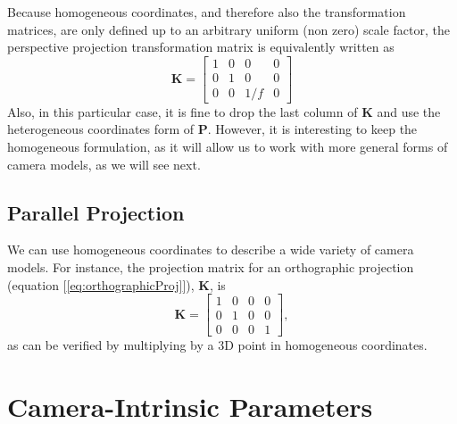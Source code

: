 Because homogeneous coordinates, and therefore also the transformation matrices, are only defined up to an arbitrary uniform (non zero) scale factor, the perspective projection transformation matrix is equivalently written as
\begin{equation}
    \mathbf{K} =             
    \begin{bmatrix}
    1 & 0 & 0 & 0 \\
    0 & 1 & 0 & 0 \\
    0 & 0 & 1/f & 0
    \end{bmatrix}
    \label{eq:homogPerspective}
\end{equation}
Also, in this particular case, it is fine to drop the last column of $\mathbf{K}$ and use the heterogeneous coordinates form of $\mathbf{P}$. However, it is interesting to keep the homogeneous formulation, as it will allow us to work with more general forms of camera models, as we will see next. 



\subsection{Parallel Projection}

We can use homogeneous coordinates to describe a wide variety of camera models.
For instance, the projection matrix for an orthographic projection (equation [\ref{eq:orthographicProj}]), $\mathbf{K}$, is
\begin{equation}
\mathbf{K} =         
    \begin{bmatrix}
    1 & 0 & 0 & 0 \\
    0 & 1 & 0 & 0 \\
    0 & 0 & 0 & 1
    \end{bmatrix}
    ,
    \label{eq:parallel_projection_matrix}
\end{equation}
as can be verified by multiplying by a 3D point in homogeneous coordinates.


\section{Camera-Intrinsic Parameters}



